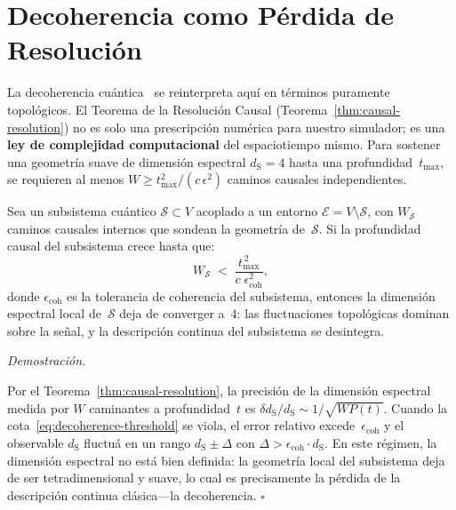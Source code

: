 \documentclass[11pt, a4paper, openany]{book}
\newcommand{\dS}{d_{\mathrm{S}}}
\renewenvironment{proof}[1][Demostraci\'on]{%
  \par\noindent\textit{#1.}\quad
}{\hfill$\square$\par\medskip}
\begin{document}
\section*{Decoherencia como P\'erdida de Resoluci\'on}

La decoherencia cu\'antica~\cite{zurek2003,zeh1970,joos2003} se
reinterpreta aqu\'i en t\'erminos puramente topol\'ogicos.
El Teorema de la Resoluci\'on Causal
(Teorema~\ref{thm:causal-resolution}) no es solo una prescripci\'on
num\'erica para nuestro simulador; es una \textbf{ley de complejidad
computacional} del espaciotiempo mismo. Para sostener una geometr\'ia
suave de dimensi\'on espectral $\dS = 4$ hasta una
profundidad~$t_{\max}$, se requieren al menos
$W \geq t_{\max}^2 / (c\,\epsilon^2)$ caminos causales
independientes.

\begin{theorem}
\label{thm:decoherence-resolution}
Sea un subsistema cu\'antico $\mathcal{S} \subset V$ acoplado a un
entorno $\mathcal{E} = V \setminus \mathcal{S}$, con $W_{\mathcal{S}}$
caminos causales internos que sondean la geometr\'ia de~$\mathcal{S}$.
Si la profundidad causal del subsistema crece hasta que:
\begin{equation}
  W_{\mathcal{S}}
  \;<\;
  \frac{t_{\max}^{\,2}}{c\;\epsilon_{\text{coh}}^2},
  \label{eq:decoherence-threshold}
\end{equation}
donde $\epsilon_{\text{coh}}$ es la tolerancia de coherencia del
subsistema, entonces la dimensi\'on espectral local de~$\mathcal{S}$
deja de converger a~$4$: las fluctuaciones topol\'ogicas dominan
sobre la se\~nal, y la descripci\'on continua del subsistema se
desintegra.
\end{theorem}

\begin{proof}
Por el Teorema~\ref{thm:causal-resolution}, la precisi\'on de la
dimensi\'on espectral medida por $W$ caminantes a profundidad~$t$ es
$\delta\dS / \dS \sim 1/\sqrt{W P(t)}$. Cuando la
cota~\eqref{eq:decoherence-threshold} se viola, el error relativo
excede~$\epsilon_{\text{coh}}$ y el observable $\dS$ fluctu\'a en un
rango $\dS \pm \Delta$ con $\Delta > \epsilon_{\text{coh}} \cdot
\dS$. En este r\'egimen, la dimensi\'on espectral no est\'a bien
definida: la geometr\'ia local del subsistema deja de ser
tetradimensional y suave, lo cual es precisamente la p\'erdida de la
descripci\'on continua cl\'asica---la decoherencia.
\end{proof}
\end{document}
